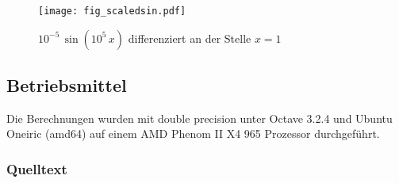 \documentclass{scrartcl}
\begin{document}
\begin{figure}[!htb]
\centering
\texttt{[image: fig\_scaledsin.pdf]}
\caption{\(10^{-5}\, \sin(10^5\, x)\) differenziert an der Stelle \(x=1\)}
\label{fig:scaledsin}
\end{figure}

\subsection{Betriebsmittel}

Die Berechnungen wurden mit double precision unter Octave 3.2.4 und Ubuntu
Oneiric (amd64) auf einem AMD Phenom II X4 965 Prozessor durchgeführt.

\subsubsection{Quelltext}


\end{document}
